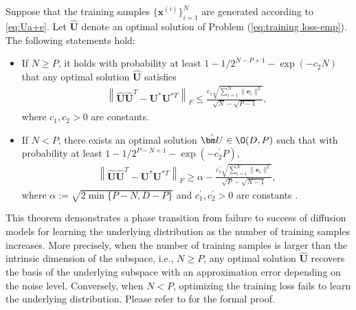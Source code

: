 \documentclass[../../book-main.tex]{subfiles}
\begin{document}
\begin{theorem}\label{thm:2}
    Suppose that the training samples $\{\bm x^{(i)}\}_{i=1}^N$ are generated according to \eqref{eq:Ua+e}. Let $\hat{\bm U}$ denote an optimal solution of Problem (\ref{eq:training loss-emp}). The following statements hold: 
    \begin{itemize} 
        \item[i)] If $N \ge P$, it holds with probability at least $1 - 1/2^{N-P+1} - \exp\left(-c_2N\right) $ that any optimal solution $\hat{\bm U}$ satisfies
   \begin{align}\label{rst1:thm 2}
       \left\|\hat{\bm U}\hat{\bm U}^T - \bm U^*\bm U^{* T}\right\|_F \le \frac{c_1\sqrt{\sum_{i=1}^N \|\bm e_i\|^2}}{\sqrt{N} - \sqrt{P-1}},
   \end{align}
   where $c_1, c_2 > 0$ are constants. 
   \item[ii)] If $N < P$, there exists an optimal solution $\hat{\bm U} \in \O(D, P)$ such that with probability at least $1 - 1/2^{P-N+1} - \exp\left(-c_2^\prime P\right)$, 
   \begin{align}\label{rst2:thm 2}
       \left\|\hat{\bm U}\hat{\bm U}^T - \bm U^*\bm U^{* T}\right\|_F \ge \alpha - 
       \frac{c_1^\prime\sqrt{\sum_{i=1}^N \|\bm e_i\|^2}}{\sqrt{P} - \sqrt{N-1}},
   \end{align}
   where $\alpha := \sqrt{2\min\{P-N, D-P\}}$ and $c_1^\prime, c_2^\prime > 0$ are constants . 
    \end{itemize}
\end{theorem} 
This theorem demonstrates a phase transition from failure to success of diffusion models for learning the underlying distribution as the number of training samples increases. More precisely, when the number of training samples is larger than the intrinsic dimension of the subspace, i.e., $N \geq P$, any optimal solution $\hat{\bm U}$ recovers the basis of the underlying subspace with an approximation error depending on the noise level. Conversely, when $N < P$, optimizing the training loss fails to learn the underlying distribution. Please refer to \citep{wang2024diffusion} for the formal proof. 
\end{document}
